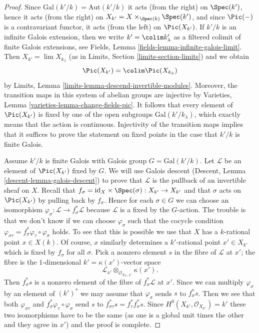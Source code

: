 \begin{proof}
Since $\text{Gal}(k'/k) = \text{Aut}(k'/k)$ it acts (from the right)
on $\Spec(k')$, hence it acts (from the right) on
$X_{k'} = X \times_{\Spec(k)} \Spec(k')$, and since $\Pic(-)$
is a contravariant functor, it acts (from the left) on $\Pic(X_{k'})$.
If $k'/k$ is an infinite Galois extension, then we write
$k' = \colim k'_\lambda$ as a filtered colimit of finite Galois
extensions, see Fields, Lemma \ref{fields-lemma-infinite-galois-limit}.
Then $X_{k'} = \lim X_{k_\lambda}$
(as in Limits, Section \ref{limits-section-limits})
and we obtain
$$
\Pic(X_{k'}) = \colim \Pic(X_{k_\lambda})
$$
by Limits, Lemma \ref{limits-lemma-descend-invertible-modules}.
Moreover, the transition maps in this system of abelian groups
are injective by Varieties, Lemma \ref{varieties-lemma-change-fields-pic}.
It follows that every element of $\Pic(X_{k'})$ is fixed by
one of the open subgroups $\text{Gal}(k'/k_\lambda)$, which exactly
means that the action is continuous. Injectivity of the transition maps
implies that it suffices to prove the statement on fixed points in the
case that $k'/k$ is finite Galois.

\medskip\noindent
Assume $k'/k$ is finite Galois with Galois group $G = \text{Gal}(k'/k)$.
Let $\mathcal{L}$ be an element of $\Pic(X_{k'})$ fixed by $G$.
We will use Galois descent (Descent, Lemma \ref{descent-lemma-galois-descent})
to prove that $\mathcal{L}$ is the pullback of an invertible sheaf on $X$.
Recall that $f_\sigma = \text{id}_X \times \Spec(\sigma) : X_{k'} \to X_{k'}$
and that $\sigma$ acts on $\Pic(X_{k'})$ by pulling back by $f_\sigma$.
Hence for each $\sigma \in G$ we can choose an isomorphism
$\varphi_\sigma : \mathcal{L} \to f_\sigma^*\mathcal{L}$
because $\mathcal{L}$ is a fixed by the $G$-action.
The trouble is that we don't know if we can choose
$\varphi_\sigma$ such that the cocycle condition
$\varphi_{\sigma\tau} = f_\sigma^*\varphi_\tau \circ \varphi_\sigma$
holds. To see that this is possible we use that $X$ has a $k$-rational point
$x \in X(k)$. Of course, $x$ similarly determines a $k'$-rational point
$x' \in X_{k'}$ which is fixed by $f_\sigma$ for all $\sigma$.
Pick a nonzero element $s$ in the fibre of $\mathcal{L}$ at $x'$;
the fibre is the $1$-dimensional $k' = \kappa(x')$-vector space
$$
\mathcal{L}_{x'} \otimes_{\mathcal{O}_{X_{k'}, x'}} \kappa(x').
$$
Then $f_\sigma^*s$ is a nonzero element of the fibre of
$f_\sigma^*\mathcal{L}$ at $x'$. Since we can multiply $\varphi_\sigma$
by an element of $(k')^*$ we may assume that $\varphi_\sigma$ sends
$s$ to $f_\sigma^*s$. Then we see that both $\varphi_{\sigma\tau}$ and
$f_\sigma^*\varphi_\tau \circ \varphi_\sigma$
send $s$ to $f_{\sigma\tau}^*s = f_\tau^*f_\sigma^*s$.
Since $H^0(X_{k'}, \mathcal{O}_{X_{k'}}) = k'$ these two isomorphisms
have to be the same (as one is a global unit times the other
and they agree in $x'$) and the proof is complete.
\end{proof}


